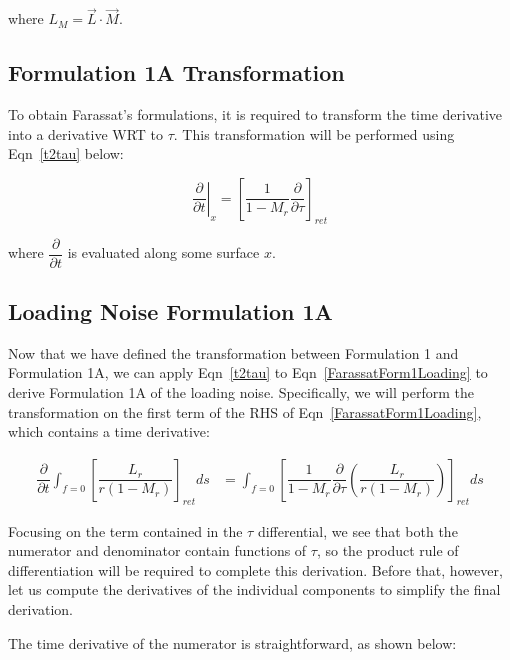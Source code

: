 \documentclass[]{aiaa-tc}%
\begin{document}
\noindent where $L_M = \vec{L} \cdot \vec{M} $.

\subsection{Formulation 1A Transformation}

To obtain Farassat's formulations, it is required to transform the time derivative into a derivative WRT to $\tau$.  This transformation will be performed using Eqn~\ref{t2tau} below:

\begin{equation} \label{t2tau}
\left. \dfrac{\partial}{\partial t} \right|_x
= \left[ \dfrac{1}{1 - M_r} \dfrac{\partial}{\partial \tau} \right]_{ret}
\end{equation}

\noindent where $\dfrac{\partial}{\partial t}$ is evaluated along some surface $x$.



\subsection{Loading Noise Formulation 1A}

Now that we have defined the transformation between Formulation 1 and Formulation 1A, we can apply Eqn~\ref{t2tau} to Eqn~\ref{FarassatForm1Loading} to derive Formulation 1A of the loading noise.  Specifically, we will perform the transformation on the first term of the RHS of Eqn~\ref{FarassatForm1Loading}, which contains a time derivative:

\begin{align} \label{DerInt}
\dfrac{\partial}{\partial t}
      \int_{f=0} \left[ \dfrac{L_r}{r   (1 - M_r)} \right]_{ret} ds
&= \int_{f=0} \left[
    \dfrac{1}{1 - M_r} \dfrac{\partial}{\partial \tau}
    \left( \dfrac{L_r}{r   (1 - M_r)}  \right)
    \right]_{ret} ds
\end{align}

Focusing on the term contained in the $\tau$ differential, we see that both the numerator and denominator contain functions of $\tau$, so the product rule of differentiation will be required to complete this derivation.  Before that, however, let us compute the derivatives of the individual components to simplify the final derivation.

The time derivative of the numerator is straightforward, as shown below:
\end{document}
